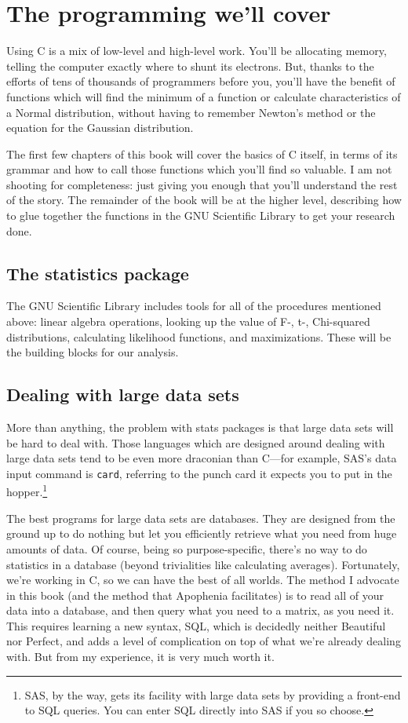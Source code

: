 \documentclass[12pt,notitlepage, openany]{book}
\begin{document}
\section{The programming we'll cover}

Using C is a mix of low-level and high-level
work. You'll be allocating memory, telling the computer exactly where
to shunt its electrons. But, thanks to the efforts of tens of thousands
of programmers before you, you'll have the benefit of functions which
will find the minimum of a function or calculate characteristics of a
Normal distribution, without having to remember Newton's method or
the equation for the Gaussian distribution.

The first few chapters of this book will cover the basics of C itself,
in terms of its grammar and how to call those functions which
you'll find so valuable. I am not shooting for completeness: just giving you enough that you'll
understand the rest of the story.  The remainder of the book will be at the higher
level, describing how to glue together the functions in the
GNU Scientific Library to get your research done.

\subsection{The statistics package} The GNU Scientific Library includes tools for
all of the procedures mentioned above: linear algebra operations, looking up the
value of F-, t-, Chi-squared distributions, calculating likelihood functions, and
maximizations. These will be the building blocks for our analysis.

\subsection{Dealing with large data sets} More than anything, the problem
with stats packages is that large data sets will be hard to deal
with. Those languages which are designed around dealing with large data
sets tend to be even more draconian than C---for example, SAS's data
input command is {\tt card}, referring to the punch card it expects you
to put in the hopper.\footnote{SAS, by the way, gets its facility with large data sets
by providing a front-end to SQL queries. You can enter SQL directly into
SAS if you so choose.}

The best programs for large data sets are databases. They are designed
from the ground up to do nothing but let you efficiently retrieve what you
need from huge amounts of data.  Of course, being so purpose-specific,
there's no way to do statistics in a database (beyond trivialities like calculating
averages). Fortunately, we're working in C, so we can have the best of
all worlds. The method I advocate in this book (and the method that
Apophenia facilitates) is to read all of your
data into a database, and then query what you need to a matrix, as you
need it. This requires learning a new syntax, SQL, which is decidedly
neither Beautiful nor Perfect, and adds a level of complication on top
of what we're already dealing with. But from my experience, it is very
much worth it.
\end{document}
